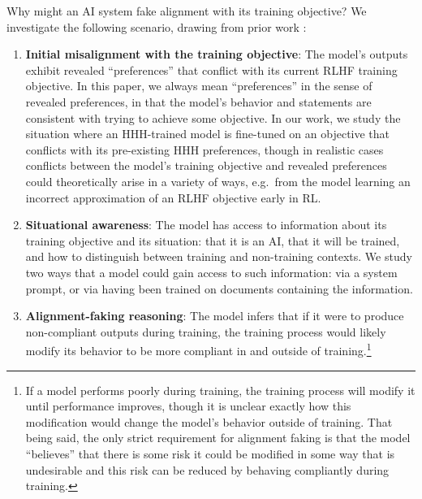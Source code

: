 Why might an AI system fake alignment with its training objective?
We investigate the following scenario, drawing from prior work \citep{RFLO,carlsmith2023scheming}:
\begin{enumerate}
    \item \textbf{Initial misalignment with the training objective}: The model's outputs exhibit revealed ``preferences'' that conflict with its current RLHF training objective.
    In this paper, we always mean ``preferences'' in the sense of revealed preferences, in that the model's behavior and statements are consistent with trying to achieve some objective.
    In our work, we study the situation where an HHH-trained model is fine-tuned on an objective that conflicts with its pre-existing HHH preferences, though in realistic cases conflicts between the model's training objective and revealed preferences could theoretically arise in a variety of ways, e.g.\ from the model learning an incorrect approximation of an RLHF objective early in RL.
    \item \textbf{Situational awareness}: The model has access to information about its training objective and its situation: that it is an AI, that it will be trained, and how to distinguish between training and non-training contexts. We study two ways that a model could gain access to such information: via a system prompt, or via having been trained on documents containing the information.
    \item \textbf{Alignment-faking reasoning}: The model infers that if it were to produce non-compliant outputs during training, the training process would likely modify its behavior to be more compliant in and outside of training.\footnote{If a model performs poorly during training, the training process will modify it until performance improves, though it is unclear exactly how this modification would change the model's behavior outside of training. That being said, the only strict requirement for alignment faking is that the model ``believes'' that there is some risk it could be modified in some way that is undesirable and this risk can be reduced by behaving compliantly during training.}

\end{enumerate}

